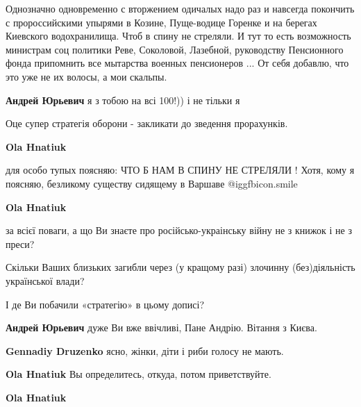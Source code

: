  
 
 
 
 
\zzSecCmt

\begin{itemize} %

Однозначно одновременно с вторжением одичалых надо раз и навсегда покончить с
пророссийскими упырями в Козине, Пуще-водице Горенке и на берегах Киевского
водохранилища. Чтоб в спину не стреляли. И тут то есть возможность министрам соц
политики Реве, Соколовой, Лазебной, руководству Пенсионного фонда припомнить
все мытарства военных пенсионеров ... От себя добавлю, что это уже не их
волосы, а мои скальпы.

\textbf{Андрей Юрьевич} я з тобою на всі 100!)) і не тільки я

Оце супер стратегія оборони - закликати до зведення прорахунків.

\begin{itemize} %
\textbf{Ola Hnatiuk} 

для особо тупых поясняю: ЧТО Б НАМ В СПИНУ НЕ СТРЕЛЯЛИ ! Хотя, кому я поясняю,
безликому существу сидящему в Варшаве  @igg{fbicon.smile} 

\textbf{Ola Hnatiuk} 

за всієї поваги, а що Ви знаєте про російсько-украінську війну не з книжок і не
з преси?

Скільки Ваших близьких загибли через (у кращому разі) злочинну (без)діяльність
української влади?

І де Ви побачили «стратегію» в цьому дописі?

\textbf{Андрей Юрьевич} дуже Ви вже ввічливі, Пане Андрію. Вітання з Києва.

\textbf{Gennadiy Druzenko} ясно, жінки, діти і риби голосу не мають.

\textbf{Ola Hnatiuk} Вы определитесь, откуда, потом приветствуйте.

\textbf{Ola Hnatiuk} 


\end{itemize}
\end{itemize}

